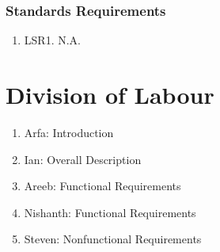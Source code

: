 \documentclass[]{article}
\begin{document}
\subsubsection{Standards Requirements}
\begin{enumerate}
	\item LSR1. N.A.
\end{enumerate}

\appendix
\section{Division of Labour}
\label{sec:division_of_labour}
\begin{enumerate}
	\item Arfa: Introduction
	\item Ian: Overall Description
	\item Areeb: Functional Requirements
	\item Nishanth: Functional Requirements
	\item Steven: Nonfunctional Requirements
\end{enumerate}
\end{document}
